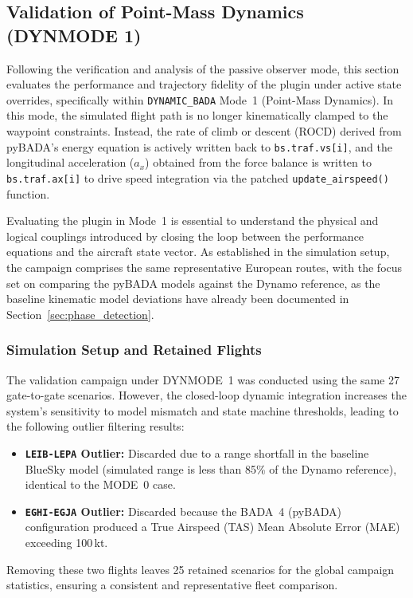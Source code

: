 \subsection{Validation of Point-Mass Dynamics (DYNMODE 1)}
\label{sec:validation_dynmode1}

Following the verification and analysis of the passive observer mode, this section evaluates the performance and trajectory fidelity of the plugin under active state overrides, specifically within \texttt{DYNAMIC\_BADA} Mode~1 (Point-Mass Dynamics). In this mode, the simulated flight path is no longer kinematically clamped to the waypoint constraints. Instead, the rate of climb or descent (ROCD) derived from pyBADA's energy equation is actively written back to \texttt{bs.traf.vs[i]}, and the longitudinal acceleration ($a_x$) obtained from the force balance is written to \texttt{bs.traf.ax[i]} to drive speed integration via the patched \texttt{update\_airspeed()} function. 

Evaluating the plugin in Mode~1 is essential to understand the physical and logical couplings introduced by closing the loop between the performance equations and the aircraft state vector. As established in the simulation setup, the campaign comprises the same representative European routes, with the focus set on comparing the pyBADA models against the Dynamo reference, as the baseline kinematic model deviations have already been documented in Section~\ref{sec:phase_detection}.

\subsubsection{Simulation Setup and Retained Flights}

The validation campaign under DYNMODE~1 was conducted using the same 27 gate-to-gate scenarios. However, the closed-loop dynamic integration increases the system's sensitivity to model mismatch and state machine thresholds, leading to the following outlier filtering results:
\begin{itemize}
    \item \textbf{\texttt{LEIB-LEPA} Outlier:} Discarded due to a range shortfall in the baseline BlueSky model (simulated range is less than 85\% of the Dynamo reference), identical to the MODE~0 case.
    \item \textbf{\texttt{EGHI-EGJA} Outlier:} Discarded because the BADA~4 (pyBADA) configuration produced a True Airspeed (TAS) Mean Absolute Error (MAE) exceeding 100\,kt. 
\end{itemize}
Removing these two flights leaves 25 retained scenarios for the global campaign statistics, ensuring a consistent and representative fleet comparison.

